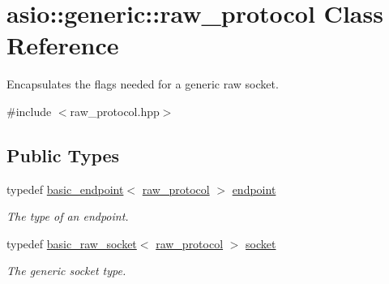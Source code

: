 \hypertarget{classasio_1_1generic_1_1raw__protocol}{}\section{asio\+:\+:generic\+:\+:raw\+\_\+protocol Class Reference}
\label{classasio_1_1generic_1_1raw__protocol}


Encapsulates the flags needed for a generic raw socket.  




{\ttfamily \#include $<$raw\+\_\+protocol.\+hpp$>$}

\subsection*{Public Types}
\begin{DoxyCompactItemize}
\item 
typedef \hyperlink{classasio_1_1generic_1_1basic__endpoint}{basic\+\_\+endpoint}$<$ \hyperlink{classasio_1_1generic_1_1raw__protocol}{raw\+\_\+protocol} $>$ \hyperlink{classasio_1_1generic_1_1raw__protocol_acf929033057209f9611472f4f23fd843}{endpoint}
\begin{DoxyCompactList}\small\item\em The type of an endpoint. \end{DoxyCompactList}\item 
typedef \hyperlink{classasio_1_1basic__raw__socket}{basic\+\_\+raw\+\_\+socket}$<$ \hyperlink{classasio_1_1generic_1_1raw__protocol}{raw\+\_\+protocol} $>$ \hyperlink{classasio_1_1generic_1_1raw__protocol_a9b6f99280e2965256061041b5bf465c6}{socket}
\begin{DoxyCompactList}\small\item\em The generic socket type. \end{DoxyCompactList}\end{DoxyCompactItemize}
